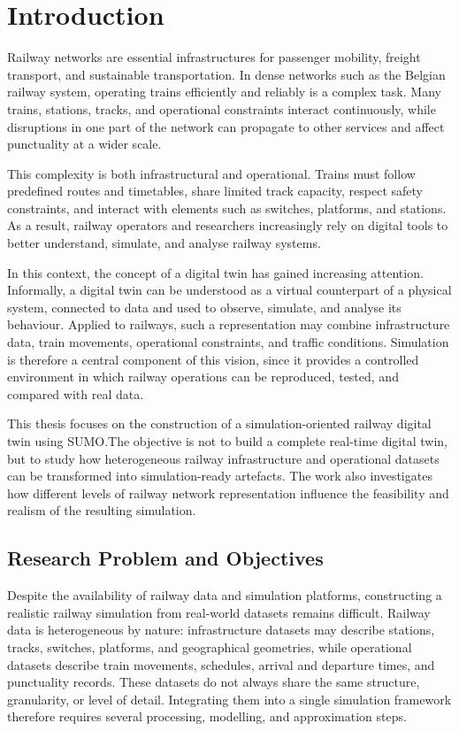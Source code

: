 \chapter{Introduction}\label{chap:introduction}
Railway networks are essential infrastructures for passenger mobility, freight transport, and sustainable transportation. 
In dense networks such as the Belgian railway system, operating trains efficiently and reliably is a complex task. Many 
trains, stations, tracks, and operational constraints interact continuously, while disruptions in one part of the network 
can propagate to other services and affect punctuality at a wider scale.

This complexity is both infrastructural and operational. Trains must follow predefined routes and timetables, share limited 
track capacity, respect safety constraints, and interact with elements such as switches, platforms, and stations. As a 
result, railway operators and researchers increasingly rely on digital tools to better understand, simulate, and analyse 
railway systems.

In this context, the concept of a digital twin has gained increasing attention. Informally, a digital twin can be 
understood as a virtual counterpart of a physical system, connected to data and used to observe, simulate, and analyse its 
behaviour. Applied to railways, such a representation may combine infrastructure data, train movements, operational 
constraints, and traffic conditions. Simulation is therefore a central component of this vision, since it provides a 
controlled environment in which railway operations can be reproduced, tested, and compared with real data.

This thesis focuses on the construction of a simulation-oriented railway digital twin using SUMO.\@ The objective is not to 
build a complete real-time digital twin, but to study how heterogeneous railway infrastructure and operational datasets can 
be transformed into simulation-ready artefacts. The work also investigates how different levels of railway network 
representation influence the feasibility and realism of the resulting simulation.


\section{Research Problem and Objectives}
Despite the availability of railway data and simulation platforms, constructing a realistic railway simulation from 
real-world datasets remains difficult. Railway data is heterogeneous by nature: infrastructure datasets may describe 
stations, tracks, switches, platforms, and geographical geometries, while operational datasets describe train movements, 
schedules, arrival and departure times, and punctuality records. These datasets do not always share the same structure, 
granularity, or level of detail. Integrating them into a single simulation framework therefore requires several processing, 
modelling, and approximation steps.

